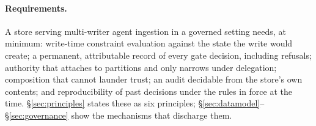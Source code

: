 \paragraph{Requirements.}
A store serving multi-writer agent ingestion in a governed setting
needs, at minimum: write-time constraint evaluation against the state
the write would create; a permanent, attributable record of every
gate decision, including refusals; authority that attaches to
partitions and only narrows under delegation; composition that cannot
launder trust; an audit decidable from the store's own contents; and
reproducibility of past decisions under the rules in force at the
time. \S\ref{sec:principles} states these as six principles;
\S\ref{sec:datamodel}--\S\ref{sec:governance} show the mechanisms that
discharge them.
